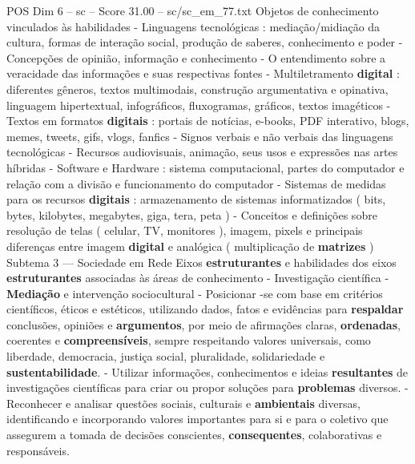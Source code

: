 \begin{textsample}{POS Dim 6 – sc – Score 31.00 – sc/sc\_em\_77.txt}
Objetos de conhecimento vinculados às habilidades - Linguagens tecnológicas : mediação/midiação da cultura, formas de interação social, produção de saberes, conhecimento e poder - Concepções de opinião, informação e conhecimento - O entendimento sobre a veracidade das informações e suas respectivas fontes - Multiletramento \textbf{digital} : diferentes gêneros, textos multimodais, construção argumentativa e opinativa, linguagem hipertextual, infográficos, fluxogramas, gráficos, textos imagéticos - Textos em formatos \textbf{digitais} : portais de notícias, e-books, PDF interativo, blogs, memes, tweets, gifs, vlogs, fanfics - Signos verbais e não verbais das linguagens tecnológicas - Recursos audiovisuais, animação, seus usos e expressões nas artes híbridas - Software e Hardware : sistema computacional, partes do computador e relação com a divisão e funcionamento do computador - Sistemas de medidas para os recursos \textbf{digitais} : armazenamento de sistemas informatizados ( bits, bytes, kilobytes, megabytes, giga, tera, peta ) - Conceitos e definições sobre resolução de telas ( celular, TV, monitores ), imagem, pixels e principais diferenças entre imagem \textbf{digital} e analógica ( multiplicação de \textbf{matrizes} ) Subtema 3 — Sociedade em Rede Eixos \textbf{estruturantes} e habilidades dos eixos \textbf{estruturantes} associadas às áreas de conhecimento - Investigação científica - \textbf{Mediação} e intervenção sociocultural - Posicionar -se com base em critérios científicos, éticos e estéticos, utilizando dados, fatos e evidências para \textbf{respaldar} conclusões, opiniões e \textbf{argumentos}, por meio de afirmações claras, \textbf{ordenadas}, coerentes e \textbf{compreensíveis}, sempre respeitando valores universais, como liberdade, democracia, justiça social, pluralidade, solidariedade e \textbf{sustentabilidade}. - Utilizar informações, conhecimentos e ideias \textbf{resultantes} de investigações científicas para criar ou propor soluções para \textbf{problemas} diversos. - Reconhecer e analisar questões sociais, culturais e \textbf{ambientais} diversas, identificando e incorporando valores importantes para si e para o coletivo que assegurem a tomada de decisões conscientes, \textbf{consequentes}, colaborativas e responsáveis.

\end{textsample}
